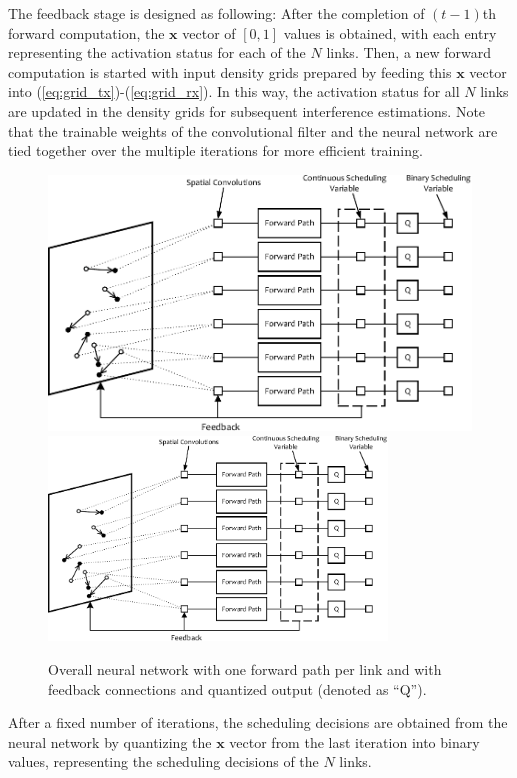 \documentclass[journal,12pt,onecolumn,draftclsnofoot,]{IEEEtran}
\begin{document}
The feedback stage is designed as following: After the completion of $(t-1)$th
forward computation, the $\mathbf x$ vector of $[0,1]$ values is obtained, with
each entry representing the activation status for each of the $N$ links. Then,
a new forward computation is started with input density grids prepared by
feeding this $\mathbf x$ vector into (\ref{eq:grid_tx})-(\ref{eq:grid_rx}).
In this way, the activation status for all $N$ links are updated in the density
grids for subsequent interference estimations. 
Note that the trainable weights of the convolutional filter and the neural
network are tied together over the multiple iterations for more efficient training.  


\begin{figure}[t!]
        \centering
        \ifOneColumn
            \includegraphics[width=12cm]{fig/learning_model}
        \else
            \includegraphics[width=9cm]{fig/learning_model}
        \fi
        \caption{Overall neural network with one forward path per link and with
feedback connections and quantized output (denoted as ``Q'').}
        \label{fig:feedback}
\end{figure}

After a fixed number of iterations, the scheduling decisions are obtained
from the neural network by quantizing the $\mathbf x$ vector from the
last iteration into binary values, representing the scheduling decisions of
the $N$ links.
\end{document}
